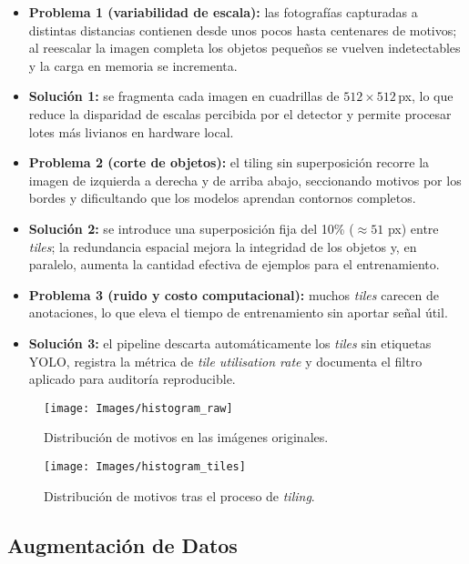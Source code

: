 \begin{itemize}
   \item \textbf{Problema 1 (variabilidad de escala):} las fotografías capturadas a distintas distancias contienen desde unos pocos hasta centenares de motivos; al reescalar la imagen completa los objetos pequeños se vuelven indetectables y la carga en memoria se incrementa.
   \item \textbf{Solución 1:} se fragmenta cada imagen en cuadrillas de \(512\times512\)\,px, lo que reduce la disparidad de escalas percibida por el detector y permite procesar lotes más livianos en hardware local.

   \item \textbf{Problema 2 (corte de objetos):} el tiling sin superposición recorre la imagen de izquierda a derecha y de arriba abajo, seccionando motivos por los bordes y dificultando que los modelos aprendan contornos completos.
   \item \textbf{Solución 2:} se introduce una superposición fija del 10\% ($\approx 51$ px) entre \emph{tiles}; la redundancia espacial mejora la integridad de los objetos y, en paralelo, aumenta la cantidad efectiva de ejemplos para el entrenamiento.

   \item \textbf{Problema 3 (ruido y costo computacional):} muchos \emph{tiles} carecen de anotaciones, lo que eleva el tiempo de entrenamiento sin aportar señal útil.
   \item \textbf{Solución 3:} el pipeline descarta automáticamente los \emph{tiles} sin etiquetas YOLO, registra la métrica de \emph{tile utilisation rate} y documenta el filtro aplicado para auditoría reproducible.
\end{itemize}

\begin{figure}[ht]
  \centering
  \texttt{[image: Images/histogram\_raw]}
  \caption{Distribución de motivos en las imágenes originales.}
  \label{fig:hist_raw}
\end{figure}

\begin{figure}[ht]
  \centering
  \texttt{[image: Images/histogram\_tiles]}
  \caption{Distribución de motivos tras el proceso de \textit{tiling}.}
  \label{fig:hist_tiles}
\end{figure}

\subsection{Augmentación de Datos}\label{ssec:augmentacion}


